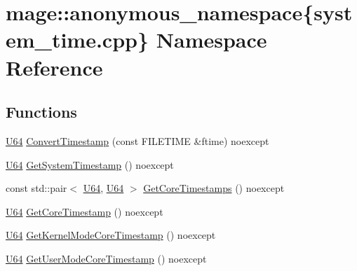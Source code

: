 \hypertarget{namespacemage_1_1anonymous__namespace_02system__time_8cpp_03}{}\section{mage\+:\+:anonymous\+\_\+namespace\{system\+\_\+time.\+cpp\} Namespace Reference}
\label{namespacemage_1_1anonymous__namespace_02system__time_8cpp_03}
\subsection*{Functions}
\begin{DoxyCompactItemize}
\item 
\mbox{\hyperlink{namespacemage_ae0ad2dd0035dba92ed0f2e84c182b03b}{U64}} \mbox{\hyperlink{namespacemage_1_1anonymous__namespace_02system__time_8cpp_03_ac1448a2c7b4dc5805087ff492ef7015c}{Convert\+Timestamp}} (const F\+I\+L\+E\+T\+I\+ME \&ftime) noexcept
\item 
\mbox{\hyperlink{namespacemage_ae0ad2dd0035dba92ed0f2e84c182b03b}{U64}} \mbox{\hyperlink{namespacemage_1_1anonymous__namespace_02system__time_8cpp_03_ac278dc49fcd5785f9cb8863fdf9fdbdd}{Get\+System\+Timestamp}} () noexcept
\item 
const std\+::pair$<$ \mbox{\hyperlink{namespacemage_ae0ad2dd0035dba92ed0f2e84c182b03b}{U64}}, \mbox{\hyperlink{namespacemage_ae0ad2dd0035dba92ed0f2e84c182b03b}{U64}} $>$ \mbox{\hyperlink{namespacemage_1_1anonymous__namespace_02system__time_8cpp_03_a5aa13d5f304eff071fda38d2218400c1}{Get\+Core\+Timestamps}} () noexcept
\item 
\mbox{\hyperlink{namespacemage_ae0ad2dd0035dba92ed0f2e84c182b03b}{U64}} \mbox{\hyperlink{namespacemage_1_1anonymous__namespace_02system__time_8cpp_03_a2fbb809b9e4c56ca9db27f2d4e959729}{Get\+Core\+Timestamp}} () noexcept
\item 
\mbox{\hyperlink{namespacemage_ae0ad2dd0035dba92ed0f2e84c182b03b}{U64}} \mbox{\hyperlink{namespacemage_1_1anonymous__namespace_02system__time_8cpp_03_abc83a6b9df6fd8a5861e0d12efb9788e}{Get\+Kernel\+Mode\+Core\+Timestamp}} () noexcept
\item 
\mbox{\hyperlink{namespacemage_ae0ad2dd0035dba92ed0f2e84c182b03b}{U64}} \mbox{\hyperlink{namespacemage_1_1anonymous__namespace_02system__time_8cpp_03_ad01a027f9d7c32f17bdd5335e403a155}{Get\+User\+Mode\+Core\+Timestamp}} () noexcept
\item 

\end{DoxyCompactItemize}
